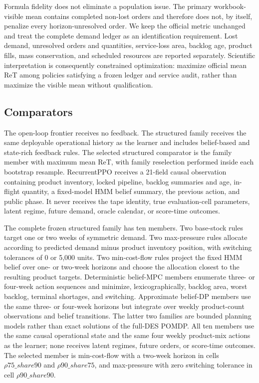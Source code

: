 \documentclass[preprint,12pt]{elsarticle}
\begin{document}
Formula fidelity does not eliminate a population issue. The primary workbook-visible mean contains completed non-lost orders and therefore does not, by itself, penalize every horizon-unresolved order. We keep the official metric unchanged and treat the complete demand ledger as an identification requirement. Lost demand, unresolved orders and quantities, service-loss area, backlog age, product fills, mass conservation, and scheduled resources are reported separately. Scientific interpretation is consequently constrained optimization: maximize official mean ReT among policies satisfying a frozen ledger and service audit, rather than maximize the visible mean without qualification.

\subsection{Comparators}

The open-loop frontier receives no feedback. The structured family receives the same deployable operational history as the learner and includes belief-based and state-rich feedback rules. The selected structured comparator is the family member with maximum mean ReT, with family reselection performed inside each bootstrap resample. RecurrentPPO receives a 21-field causal observation containing product inventory, locked pipeline, backlog summaries and age, in-flight quantity, a fixed-model HMM belief summary, the previous action, and public phase. It never receives the tape identity, true evaluation-cell parameters, latent regime, future demand, oracle calendar, or score-time outcomes.

The complete frozen structured family has ten members. Two base-stock rules target one or two weeks of symmetric demand. Two max-pressure rules allocate according to predicted demand minus product inventory position, with switching tolerances of 0 or 5,000 units. Two min-cost-flow rules project the fixed HMM belief over one- or two-week horizons and choose the allocation closest to the resulting product targets. Deterministic belief-MPC members enumerate three- or four-week action sequences and minimize, lexicographically, backlog area, worst backlog, terminal shortages, and switching. Approximate belief-DP members use the same three- or four-week horizons but integrate over weekly product-count observations and belief transitions. The latter two families are bounded planning models rather than exact solutions of the full-DES POMDP. All ten members use the same causal operational state and the same four weekly product-mix actions as the learner; none receives latent regimes, future orders, or score-time outcomes. The selected member is min-cost-flow with a two-week horizon in cells $\rho75\_share90$ and $\rho90\_share75$, and max-pressure with zero switching tolerance in cell $\rho90\_share90$.
\end{document}
